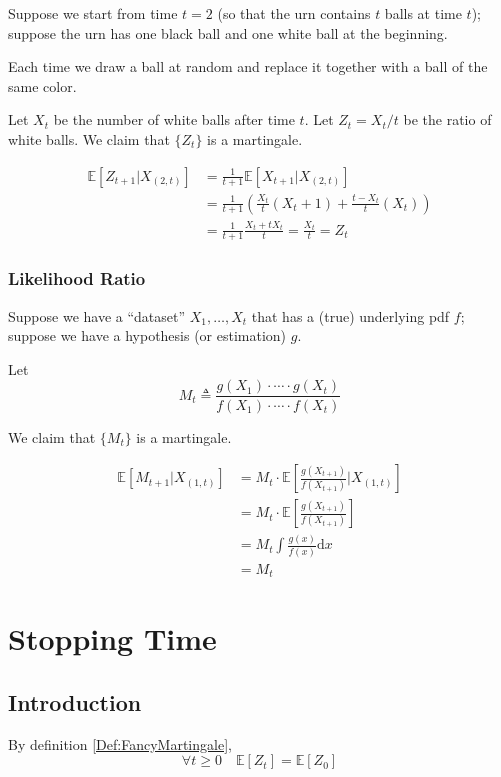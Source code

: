         Suppose we start from time $t=2$ (so that the urn contains $t$ balls at time $t$); suppose the urn has one black ball and one white ball at the beginning.
        
        Each time we draw a ball at random and replace it together with a ball of the same color.

        Let $X_t$ be the number of white balls after time $t$. Let $Z_t = X_t/t$ be the ratio of white balls. We claim that $\{Z_t\}$ is a martingale.

        \begin{align*}
            \mathbb{E}\left[Z_{t+1}|X_{(2,t)}\right] &= \frac{1}{t+1}\mathbb{E}[X_{t+1}|X_{(2,t)}]\\
            &= \frac{1}{t+1}\left(\frac{X_t}{t}\left(X_t+1\right) + \frac{t-X_t}{t}\left(X_t\right)\right)\\
            &= \frac{1}{t+1}\frac{X_t + tX_t}{t} = \frac{X_t}{t} = Z_t
        \end{align*}

        \subsubsection{Likelihood Ratio}
        Suppose we have a ``dataset'' $X_1,\dots,X_t$ that has a (true) underlying pdf $f$; suppose we have a hypothesis (or estimation) $g$.

        Let 
        \[ M_t \triangleq \frac{g(X_1)\cdot \cdots \cdot g(X_t)}{f(X_1)\cdot \cdots \cdot f(X_t)} \]

        We claim that $\{M_t\}$ is a martingale.

        \begin{align*}
            \mathbb{E}[M_{t+1}|X_{(1,t)}] &= M_t\cdot\mathbb{E}\left[\frac{g(X_{t+1})}{f(X_{t+1})}|X_{(1,t)}\right]\\
            &= M_t \cdot \mathbb{E}\left[\frac{g(X_{t+1})}{f(X_{t+1})}\right]\\
            &= M_t \int \frac{g(x)}{f(x)}\mathrm{d}x \\
            &= M_t
        \end{align*}


\section{Stopping Time}
    \subsection{Introduction}
        By definition \ref{Def:FancyMartingale},
        \[ \forall t \ge 0 \quad \mathbb{E}[Z_t] = \mathbb{E}[Z_0] \]

